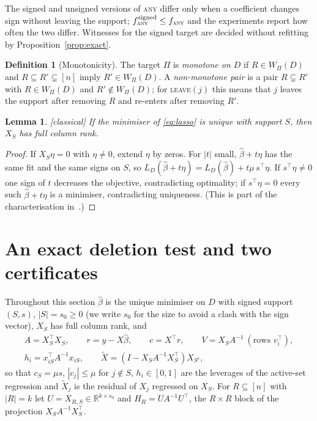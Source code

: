 \documentclass[10pt,a4paper]{article}
\theoremstyle{plain}
\newtheorem{lemma}[theorem]{Lemma}
\theoremstyle{definition}
\newtheorem{definition}[theorem]{Definition}
\theoremstyle{remark}
\newcommand{\R}{\mathbb{R}}
\newcommand{\Sc}{S^{\mathrm{c}}}
\newcommand{\status}[1]{\textnormal{\textsf{\small [#1]}}}
\newcommand{\tsc}[1]{\textnormal{\textsc{#1}}}  %
\begin{document}
The signed and unsigned versions of \tsc{any} differ only when a coefficient changes sign without leaving the support; $f_{\tsc{any}}^{\mathrm{signed}}\le f_{\tsc{any}}$ and the experiments report how often the two differ. Witnesses for the signed target are decided without refitting by Proposition~\ref{prop:exact}.

\begin{definition}[Monotonicity]\label{def:mono}
The target $\Pi$ is \emph{monotone on $D$} if $R\in W_\Pi(D)$ and $R\subseteq R'\subsetneq[n]$ imply $R'\in W_\Pi(D)$. A \emph{non-monotone pair} is a pair $R\subsetneq R'$ with $R\in W_\Pi(D)$ and $R'\notin W_\Pi(D)$; for \tsc{leave}$(j)$ this means that $j$ leaves the support after removing $R$ and re-enters after removing $R'$.
\end{definition}

\begin{lemma}\label{lem:rank}\status{classical}
If the minimiser of \eqref{eq:lasso} is unique with support $S$, then $X_S$ has full column rank.
\end{lemma}
\begin{proof}
If $X_S\eta=0$ with $\eta\neq0$, extend $\eta$ by zeros. For $|t|$ small, $\hat\beta+t\eta$ has the same fit and the same signs on $S$, so $L_D(\hat\beta+t\eta)=L_D(\hat\beta)+t\mu\,s^{\top}\eta$. If $s^{\top}\eta\ne0$ one sign of $t$ decreases the objective, contradicting optimality; if $s^{\top}\eta=0$ every such $\hat\beta+t\eta$ is a minimiser, contradicting uniqueness. (This is part of the characterisation in~\citealp{tibshirani2013}.)
\end{proof}

\section{An exact deletion test and two certificates}\label{sec:exact}

Throughout this section $\hat\beta$ is the unique minimiser on $D$ with signed support $(S,s)$, $|S|=s_0\ge0$ (we write $s_0$ for the size to avoid a clash with the sign vector), $X_S$ has full column rank, and
\begin{gather*}
A=X_S^{\top}X_S,\qquad r=y-X\hat\beta,\qquad c=X^{\top}r,\qquad V=X_SA^{-1}\ (\text{rows }v_i^{\top}),\\
h_i=x_{iS}^{\top}A^{-1}x_{iS},\qquad \tilde X=(I-X_SA^{-1}X_S^{\top})X_{\Sc},
\end{gather*}
so that $c_S=\mu s$, $|c_j|\le\mu$ for $j\notin S$, $h_i\in[0,1]$ are the leverages of the active-set regression and $\tilde X_j$ is the residual of $X_j$ regressed on $X_S$. For $R\subseteq[n]$ with $|R|=k$ let $U=X_{R,S}\in\R^{k\times s_0}$ and $H_R=UA^{-1}U^{\top}$, the $R\times R$ block of the projection $X_SA^{-1}X_S^{\top}$.
\end{document}
